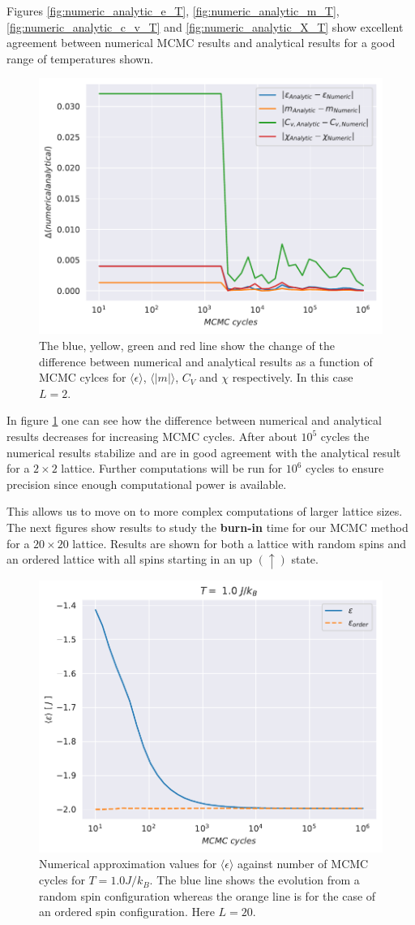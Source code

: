 \documentclass[english,notitlepage,reprint,nofootinbib]{revtex4-1}  %
\begin{document}
Figures \ref{fig:numeric_analytic_e_T}, \ref{fig:numeric_analytic_m_T}, \ref{fig:numeric_analytic_c_v_T} and \ref{fig:numeric_analytic_X_T} show excellent agreement between numerical MCMC results and analytical results for a good range of temperatures shown. 

\begin{figure}[H]
    \centering
    \includegraphics[width=.5\textwidth]{../figures/numeric_analytic.pdf}
    \caption{The blue, yellow, green and red line show the change of the difference between numerical and analytical results as a function of MCMC cylces for $\langle \epsilon \rangle$, $\langle |m| \rangle$, $C_V$ and $\chi$ respectively. In this case $L=2$.}
    \label{fig:numeric_analytic}
\end{figure}
In figure \ref{fig:numeric_analytic} one can see how the difference between numerical and analytical results decreases for increasing MCMC cycles. After about $10^{5}$ cycles the numerical results stabilize and are in good agreement with the analytical result for a $2 \times 2$ lattice. Further computations will be run for $10^6$ cycles to ensure precision since enough computational power is available.

This allows us to move on to more complex computations of larger lattice sizes. The next figures show results to study the \textbf{burn-in} time for our MCMC method for a $20 \times 20$ lattice. Results are shown for both a lattice with random spins and an ordered lattice with all spins starting in an up $(\uparrow)$ state. 

\begin{figure}[H]
    \centering
    \includegraphics[width=.5\textwidth]{../figures/numeric_L_20_T_1_e.pdf}
    \caption{Numerical approximation values for $\langle \epsilon \rangle$ against number of MCMC cycles for $T=1.0 J/k_B$. The blue line shows the evolution from a random spin configuration whereas the orange line is for the case of an ordered spin configuration. Here $L=20$.}
    \label{fig:numeric_L_20_T_1_e}
\end{figure}
\end{document}
